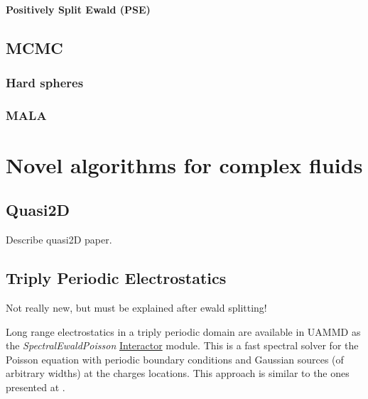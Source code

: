 \documentclass[ twoside,openright,titlepage,numbers=noenddot,%
headinclude,footinclude,cleardoublepage=empty,abstract=on,
BCOR=5mm,paper=a4,fontsize=11pt, dvipsnames
]{scrreprt}
\newcommand{\red}[1]{{\color{red}#1}}
\begin{document}
\subsection{Positively Split Ewald (PSE)}


\chapter{MCMC}

\section{Hard spheres}

\section{MALA}



\cleardoublepage
\part{Novel algorithms for complex fluids}\label{pt:algo}


\chapter{Quasi2D}

Describe quasi2D paper.


\chapter{Triply Periodic Electrostatics} \label{ch:tppoisson}
\red{Not really new, but must be explained after ewald splitting!}

Long range electrostatics in a triply periodic domain are available in \gls{UAMMD} as the \emph{SpectralEwaldPoisson} \hyperref[sec:interactor]{Interactor} module.  
This is a fast spectral solver for the Poisson equation with periodic boundary conditions and Gaussian sources (of arbitrary widths) at the charges locations. This approach is similar to the ones presented at \cite{sepois1,sepois2, sepois3}.
\end{document}

